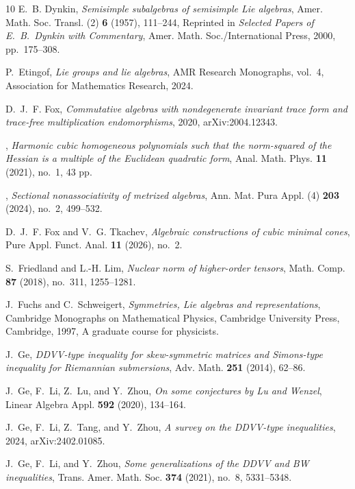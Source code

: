 \begin{thebibliography}{10}
E.~B. Dynkin, \emph{Semisimple subalgebras of semisimple {L}ie algebras}, Amer.
  Math. Soc. Transl. (2) \textbf{6} (1957), 111--244, Reprinted in
  \emph{Selected Papers of E.~B.~Dynkin with Commentary}, Amer. Math.
  Soc./International Press, 2000, pp.~175--308.

P.~Etingof, \emph{Lie groups and lie algebras}, AMR Research Monographs,
  vol.~4, Association for Mathematics Research, 2024.

D.~J.~F. Fox, \emph{Commutative algebras with nondegenerate invariant trace
  form and trace-free multiplication endomorphisms}, 2020, arXiv:2004.12343.

\bysame, \emph{Harmonic cubic homogeneous polynomials such that the
  norm-squared of the {H}essian is a multiple of the {E}uclidean quadratic
  form}, Anal. Math. Phys. \textbf{11} (2021), no.~1, 43 pp.

\bysame, \emph{Sectional nonassociativity of metrized algebras}, Ann. Mat. Pura
  Appl. (4) \textbf{203} (2024), no.~2, 499--532.

D.~J.~F. Fox and V.~G. Tkachev, \emph{Algebraic constructions of cubic minimal
  cones}, Pure Appl. Funct. Anal. \textbf{11} (2026), no.~2.

S.~Friedland and L.-H. Lim, \emph{Nuclear norm of higher-order tensors}, Math.
  Comp. \textbf{87} (2018), no.~311, 1255--1281.

J.~Fuchs and C.~Schweigert, \emph{Symmetries, {L}ie algebras and
  representations}, Cambridge Monographs on Mathematical Physics, Cambridge
  University Press, Cambridge, 1997, A graduate course for physicists.

J.~Ge, \emph{D{DVV}-type inequality for skew-symmetric matrices and
  {S}imons-type inequality for {R}iemannian submersions}, Adv. Math.
  \textbf{251} (2014), 62--86.

J.~Ge, F.~Li, Z.~Lu, and Y.~Zhou, \emph{On some conjectures by {L}u and
  {W}enzel}, Linear Algebra Appl. \textbf{592} (2020), 134--164.

J.~Ge, F.~Li, Z.~Tang, and Y.~Zhou, \emph{A survey on the {DDVV}-type
  inequalities}, 2024, arXiv:2402.01085.

J.~Ge, F.~Li, and Y.~Zhou, \emph{Some generalizations of the {DDVV} and {BW}
  inequalities}, Trans. Amer. Math. Soc. \textbf{374} (2021), no.~8,
  5331--5348.


\end{thebibliography}
